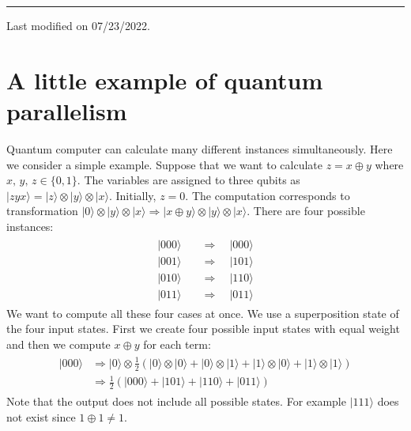 \documentclass[letterpaper,10pt,english]{jupyterBook}
\begin{document}
\bigskip\hrule\bigskip


\sphinxAtStartPar
Last modified on 07/23/2022.

\sphinxstepscope


\section{A little example of quantum parallelism}
\label{\detokenize{algorithms/qparallel:a-little-example-of-quantum-parallelism}}\label{\detokenize{algorithms/qparallel:sec-qparallel}}\label{\detokenize{algorithms/qparallel::doc}}
\sphinxAtStartPar
Quantum computer can calculate many different instances simultaneously. Here we consider a simple example.  Suppose that we want to calculate \(z = x \oplus y\) where \(x,\, y,\, z \in \{0,1\}\).  The variables are assigned to three qubits as \(|zyx\rangle = |z\rangle \otimes |y\rangle \otimes |x\rangle\).  Initially, \(z=0\).  The computation corresponds to transformation \(|0\rangle \otimes |y\rangle \otimes |x\rangle \Rightarrow |x \oplus y\rangle \otimes |y\rangle \otimes |x\rangle\).  There are four possible instances:
\begin{equation*}
\begin{split}
\begin{align}
|000\rangle \quad &\Rightarrow \quad |000\rangle \\
|001\rangle \quad &\Rightarrow \quad |101\rangle \\
|010\rangle \quad &\Rightarrow \quad |110\rangle \\
|011\rangle \quad &\Rightarrow \quad |011\rangle
\end{align}
\end{split}
\end{equation*}
\sphinxAtStartPar
We want to compute all these four cases at once.  We use a superposition state of the four input states. First we create four possible input states with equal weight and then we compute \(x\oplus y\) for each term:
\begin{equation*}
\begin{split}
\begin{align}
|000\rangle &\Rightarrow |0\rangle \otimes \frac{1}{2}\left(|0\rangle\otimes|0\rangle+|0\rangle\otimes|1\rangle+|1\rangle\otimes|0\rangle + |1\rangle\otimes|1\rangle \right) \\
&\Rightarrow \frac{1}{2}\left(|000\rangle + |101\rangle + |110\rangle + |011\rangle \right)
\end{align}
\end{split}
\end{equation*}
\sphinxAtStartPar
Note that the output does not include all possible states.  For example \(|111\rangle\) does not exist since \(1\oplus 1 \ne 1\).
\end{document}

